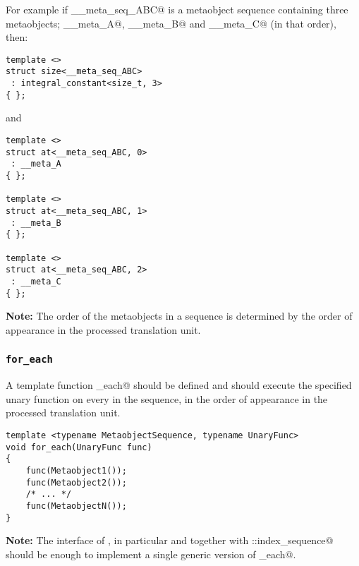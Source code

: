 For example if \verb@__meta_seq_ABC@ is a metaobject sequence containing three metaobjects;
\verb@__meta_A@, \verb@__meta_B@ and \verb@__meta_C@ (in that order), then:

\begin{verbatim}
template <>
struct size<__meta_seq_ABC>
 : integral_constant<size_t, 3>
{ };
\end{verbatim}

and 

\begin{verbatim}
template <>
struct at<__meta_seq_ABC, 0>
 : __meta_A
{ };

template <>
struct at<__meta_seq_ABC, 1>
 : __meta_B
{ };

template <>
struct at<__meta_seq_ABC, 2>
 : __meta_C
{ };
\end{verbatim}

\textbf{Note:} The order of the metaobjects in a sequence is determined by the order
of appearance in the processed translation unit.

\subsubsection{\texttt{for\_each}}

A template function \verb@for_each@ should be defined and should
execute the specified unary function on every  in
the sequence, in the order of appearance in the processed translation unit.

\begin{verbatim}
template <typename MetaobjectSequence, typename UnaryFunc>
void for_each(UnaryFunc func)
{
	func(Metaobject1());
	func(Metaobject2());
	/* ... */
	func(MetaobjectN());
}

\end{verbatim}

\textbf{Note:} The interface of , in particular \verb@size@
and \verb@at@ together with \verb@std::index_sequence@ should be enough
to implement a single generic version of \verb@for_each@.

